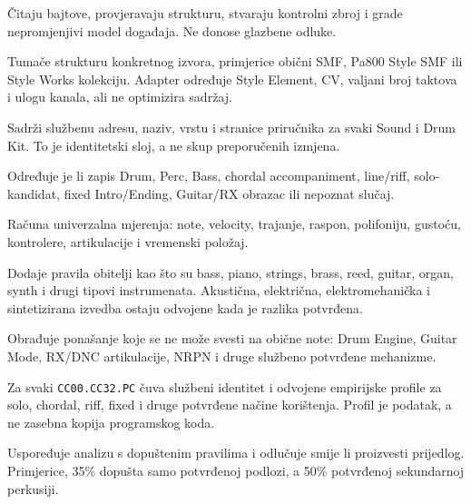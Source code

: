 \documentclass[11pt]{article}
\begin{document}
\begin{description}[style=nextline]
    \item[Core Loader i MIDI parser]
    Čitaju bajtove, provjeravaju strukturu, stvaraju kontrolni zbroj i grade
    nepromjenjivi model događaja. Ne donose glazbene odluke.

    \item[Source adapteri]
    Tumače strukturu konkretnog izvora, primjerice obični SMF, Pa800 Style SMF
    ili Style Works kolekciju. Adapter određuje Style Element, CV, valjani broj
    taktova i ulogu kanala, ali ne optimizira sadržaj.

    \item[Pa800 registar]
    Sadrži službenu adresu, naziv, vrstu i stranice priručnika za svaki Sound i
    Drum Kit. To je identitetski sloj, a ne skup preporučenih izmjena.

    \item[Context Classifier]
    Određuje je li zapis Drum, Perc, Bass, chordal accompaniment, line/riff,
    solo-kandidat, fixed Intro/Ending, Guitar/RX obrazac ili nepoznat slučaj.

    \item[Zajednički Instrument Engine]
    Računa univerzalna mjerenja: note, velocity, trajanje, raspon, polifoniju,
    gustoću, kontrolere, artikulacije i vremenski položaj.

    \item[Family Engine]
    Dodaje pravila obitelji kao što su bass, piano, strings, brass, reed,
    guitar, organ, synth i drugi tipovi instrumenata. Akustična, električna,
    elektromehanička i sintetizirana izvedba ostaju odvojene kada je razlika
    potvrđena.

    \item[Specijalizirani Engine]
    Obrađuje ponašanje koje se ne može svesti na obične note: Drum Engine,
    Guitar Mode, RX/DNC artikulacije, NRPN i druge službeno potvrđene mehanizme.

    \item[Profil pojedinog instrumenta]
    Za svaki \texttt{CC00.CC32.PC} čuva službeni identitet i odvojene
    empirijske profile za solo, chordal, riff, fixed i druge potvrđene načine
    korištenja. Profil je podatak, a ne zasebna kopija programskog koda.

    \item[Policy Engine]
    Uspoređuje analizu s dopuštenim pravilima i odlučuje smije li proizvesti
    prijedlog. Primjerice, 35\% dopušta samo potvrđenoj podlozi, a 50\%
    potvrđenoj sekundarnoj perkusiji.


\end{description}
\end{document}
